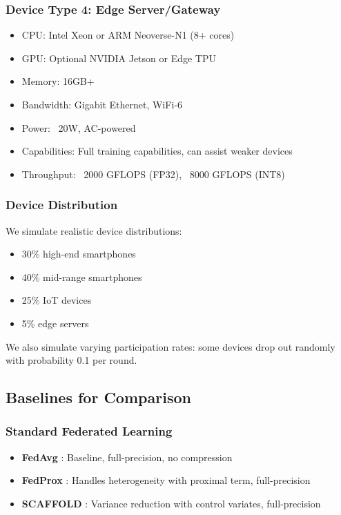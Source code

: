 \documentclass[journal]{IEEEtran}
\begin{document}
\subsubsection{Device Type 4: Edge Server/Gateway}

\begin{itemize}
    \item CPU: Intel Xeon or ARM Neoverse-N1 (8+ cores)
    \item GPU: Optional NVIDIA Jetson or Edge TPU
    \item Memory: 16GB+
    \item Bandwidth: Gigabit Ethernet, WiFi-6
    \item Power: ~20W, AC-powered
    \item Capabilities: Full training capabilities, can assist weaker devices
    \item Throughput: ~2000 GFLOPS (FP32), ~8000 GFLOPS (INT8)
\end{itemize}

\subsubsection{Device Distribution}

We simulate realistic device distributions:
\begin{itemize}
    \item 30\% high-end smartphones
    \item 40\% mid-range smartphones
    \item 25\% IoT devices
    \item 5\% edge servers
\end{itemize}

We also simulate varying participation rates: some devices drop out randomly with probability 0.1 per round.

\subsection{Baselines for Comparison}

\subsubsection{Standard Federated Learning}

\begin{itemize}
    \item \textbf{FedAvg} \cite{mcmahan2017communication}: Baseline, full-precision, no compression
    \item \textbf{FedProx} \cite{li2020federated}: Handles heterogeneity with proximal term, full-precision
    \item \textbf{SCAFFOLD} \cite{karimireddy2020scaffold}: Variance reduction with control variates, full-precision
\end{itemize}
\end{document}
